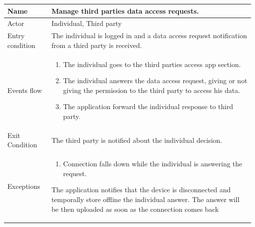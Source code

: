 \begin{tabular}{|l|p{11cm}|}
    \hline
    Name & Manage third parties data access requests.
    \\ \hline
    Actor & Individual, Third party
    \\ \hline 
    Entry condition & The individual is logged in and a data access request notification from a third party is received.
    \\ \hline
    Events flow &
    \begin{enumerate}
	\item The individual goes to the third parties access app section.
    \item The individual answers the data access request, giving or not giving the permission to the third party to access his data.
    \item The application forward the individual response to third party.
    \end{enumerate}
     \\ \hline
     Exit Condition & The third party is notified about the individual decision.
     \\
    \hline
    Exceptions &
        \begin{enumerate}
    \item Connection falls down while the individual is answering the request.

    \end{enumerate}
The application notifies that the device is disconnected and temporally store offline the individual answer. The answer will be then uploaded as soon as the connection comes back
      \\
    \hline
\end{tabular}



